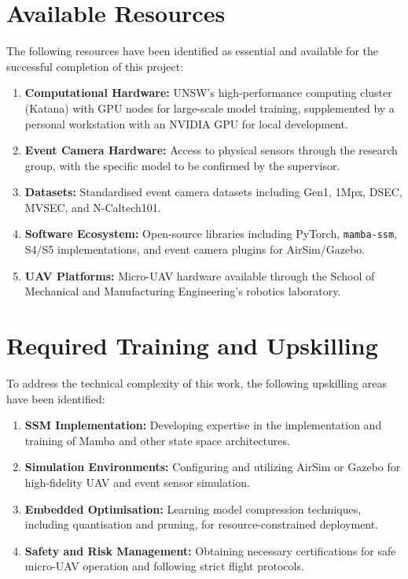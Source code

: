 \documentclass[11pt, a4paper]{report}
\begin{document}
\section{Available Resources}
The following resources have been identified as essential and available for the successful completion of this project:
\begin{enumerate}
    \item \textbf{Computational Hardware:} UNSW's high-performance computing cluster (Katana) with GPU nodes for large-scale model training, supplemented by a personal workstation with an NVIDIA GPU for local development.
    \item \textbf{Event Camera Hardware:} Access to physical sensors through the research group, with the specific model to be confirmed by the supervisor.
    \item \textbf{Datasets:} Standardised event camera datasets including Gen1, 1Mpx, DSEC, MVSEC, and N-Caltech101.
    \item \textbf{Software Ecosystem:} Open-source libraries including PyTorch, \texttt{mamba-ssm}, S4/S5 implementations, and event camera plugins for AirSim/Gazebo.
    \item \textbf{UAV Platforms:} Micro-UAV hardware available through the School of Mechanical and Manufacturing Engineering’s robotics laboratory.
\end{enumerate}

\section{Required Training and Upskilling}
To address the technical complexity of this work, the following upskilling areas have been identified:
\begin{enumerate}
    \item \textbf{SSM Implementation:} Developing expertise in the implementation and training of Mamba and other state space architectures.
    \item \textbf{Simulation Environments:} Configuring and utilizing AirSim or Gazebo for high-fidelity UAV and event sensor simulation.
    \item \textbf{Embedded Optimisation:} Learning model compression techniques, including quantisation and pruning, for resource-constrained deployment.
    \item \textbf{Safety and Risk Management:} Obtaining necessary certifications for safe micro-UAV operation and following strict flight protocols.
\end{enumerate}
\end{document}
